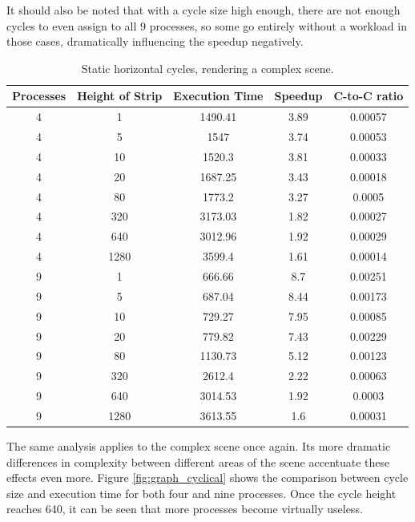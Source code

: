 \documentclass[CMPE]{KGCOEReport}
\begin{document}
It should also be noted that with a cycle size high enough, there are not enough cycles 
to even assign to all 9 processes, so some go entirely without a workload in those 
cases, dramatically influencing the speedup negatively. \\

\vspace*{1mm}

\begin{table}[!htpb]
\centering
\caption{Static horizontal cycles, rendering a complex scene.}
\label{tab:static-cycles-complex}
\begin{tabular}{ccccc}
\hline
\multicolumn{1}{l}{Processes} &
  \multicolumn{1}{l}{Height of Strip} &
  \multicolumn{1}{l}{Execution Time} &
  \multicolumn{1}{l}{Speedup} &
  \multicolumn{1}{l}{C-to-C ratio} \\ \hline
4 & 1    & 1490.41 & 3.89 & 0.00057 \\
4 & 5    & 1547    & 3.74 & 0.00053 \\
4 & 10   & 1520.3  & 3.81 & 0.00033 \\
4 & 20   & 1687.25 & 3.43 & 0.00018 \\
4 & 80   & 1773.2  & 3.27 & 0.0005  \\
4 & 320  & 3173.03 & 1.82 & 0.00027 \\ 
4 & 640  & 3012.96 & 1.92 & 0.00029 \\
4 & 1280 & 3599.4  & 1.61 & 0.00014 \\\hline
9 & 1    & 666.66  & 8.7  & 0.00251 \\
9 & 5    & 687.04  & 8.44 & 0.00173 \\
9 & 10   & 729.27  & 7.95 & 0.00085 \\
9 & 20   & 779.82  & 7.43 & 0.00229 \\
9 & 80   & 1130.73 & 5.12 & 0.00123 \\
9 & 320  & 2612.4  & 2.22 & 0.00063 \\
9 & 640  & 3014.53 & 1.92 & 0.0003  \\
9 & 1280 & 3613.55 & 1.6  & 0.00031
\end{tabular}
\end{table}

\vspace*{1mm}

The same analysis applies to the complex scene once again. Its more dramatic 
differences in complexity between different areas of the scene accentuate 
these effects even more. Figure \ref{fig:graph_cyclical} shows the comparison 
between cycle size and execution time for both four and nine processes. Once 
the cycle height reaches 640, it can be seen that more processes become 
virtually useless.
\end{document}

